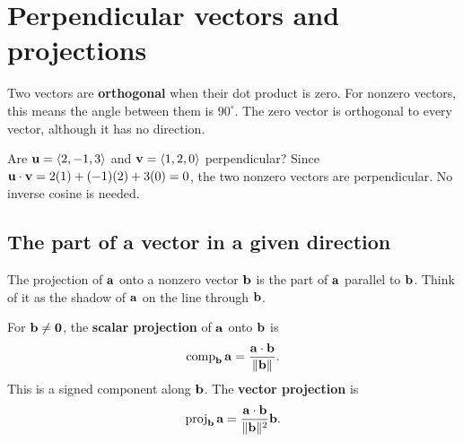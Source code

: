 \documentclass[11pt]{article}
\renewcommand{\solutionheight}{14mm}
\begin{document}
\newpage
\renewcommand{\solutionheight}{24mm}
\section{Perpendicular vectors and projections}
\begin{definition}[Orthogonality]
Two vectors are \textbf{orthogonal} when their dot product is zero.
For nonzero vectors, this means the angle between them is $90^\circ$.
The zero vector is orthogonal to every vector, although it has no direction.
\end{definition}

\begin{example}{Are $\mathbf{u}=\left\langle 2,-1,3\right\rangle$ and
$\mathbf{v}=\left\langle 1,2,0\right\rangle$ perpendicular?}
Since $\mathbf{u}\cdot\mathbf{v}=2(1)+(-1)(2)+3(0)=0$, the two nonzero vectors
are perpendicular. No inverse cosine is needed.
\end{example}

\subsection*{The part of a vector in a given direction}
The projection of $\mathbf{a}$ onto a nonzero vector $\mathbf{b}$ is the part of
$\mathbf{a}$ parallel to $\mathbf{b}$. Think of it as the shadow of $\mathbf{a}$ on the
line through $\mathbf{b}$.

\begin{center}
\end{center}

\begin{definition}
For $\mathbf{b}\ne\mathbf{0}$, the \textbf{scalar projection} of $\mathbf{a}$ onto $\mathbf{b}$ is
\[
 \operatorname{comp}_{\mathbf{b}}\mathbf{a}
 =\frac{\mathbf{a}\cdot\mathbf{b}}{\lVert\mathbf{b}\rVert}.
\]
This is a signed component along $\mathbf{b}$. The \textbf{vector projection} is
\[
 \operatorname{proj}_{\mathbf{b}}\mathbf{a}
 =\frac{\mathbf{a}\cdot\mathbf{b}}{\lVert\mathbf{b}\rVert^2}\mathbf{b}.
\]
\end{definition}
\end{document}
